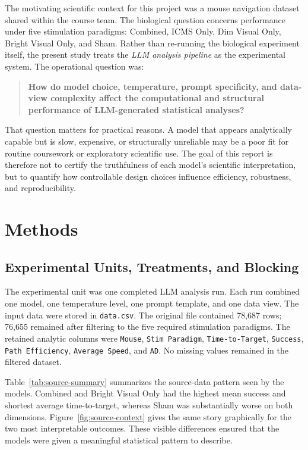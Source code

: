 \documentclass{article}
\begin{document}
The motivating scientific context for this project was a mouse navigation dataset shared within the course team. The biological question concerns performance under five stimulation paradigms: Combined, ICMS Only, Dim Visual Only, Bright Visual Only, and Sham. Rather than re-running the biological experiment itself, the present study treats the \emph{LLM analysis pipeline} as the experimental system. The operational question was:

\begin{quote}
\textbf{How do model choice, temperature, prompt specificity, and data-view complexity affect the computational and structural performance of LLM-generated statistical analyses?}
\end{quote}

That question matters for practical reasons. A model that appears analytically capable but is slow, expensive, or structurally unreliable may be a poor fit for routine coursework or exploratory scientific use. The goal of this report is therefore not to certify the truthfulness of each model's scientific interpretation, but to quantify how controllable design choices influence efficiency, robustness, and reproducibility.

\section{Methods}

\subsection{Experimental Units, Treatments, and Blocking}

The experimental unit was one completed LLM analysis run. Each run combined one model, one temperature level, one prompt template, and one data view. The input data were stored in \texttt{data.csv}. The original file contained 78{,}687 rows; 76{,}655 remained after filtering to the five required stimulation paradigms. The retained analytic columns were \texttt{Mouse}, \texttt{Stim Paradigm}, \texttt{Time-to-Target}, \texttt{Success}, \texttt{Path Efficiency}, \texttt{Average Speed}, and \texttt{AD}. No missing values remained in the filtered dataset.

Table~\ref{tab:source-summary} summarizes the source-data pattern seen by the models. Combined and Bright Visual Only had the highest mean success and shortest average time-to-target, whereas Sham was substantially worse on both dimensions. Figure~\ref{fig:source-context} gives the same story graphically for the two most interpretable outcomes. These visible differences ensured that the models were given a meaningful statistical pattern to describe.
\end{document}
